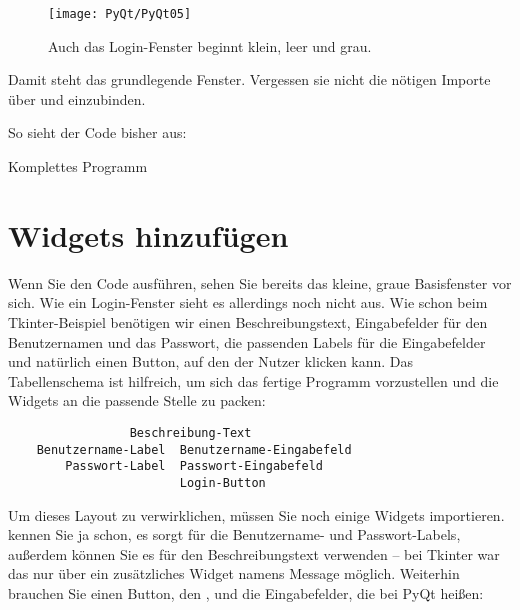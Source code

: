 
\medskip

\begin{figure}
  \texttt{[image: PyQt/PyQt05]}    
  \caption{Auch das Login-Fenster beginnt klein, leer und grau.}\label{PyQt05}
\end{figure}     
    
    

Damit steht das grundlegende Fenster. Vergessen sie nicht die nötigen Importe über  und  einzubinden.
    
So sieht der Code bisher aus:

\medskip
  
\begin{code}
          
  \caption{Komplettes Programm }
\end{code}     

 
\section{Widgets hinzufügen}

Wenn Sie den Code ausführen, sehen Sie bereits das kleine, graue Basisfenster vor sich. Wie ein Login-Fenster sieht es allerdings noch nicht aus. Wie schon beim Tkinter-Beispiel benötigen wir einen Beschreibungstext, Eingabefelder für den Benutzernamen und das Passwort, die passenden Labels für die Eingabefelder und natürlich einen Button, auf den der Nutzer klicken kann. Das Tabellenschema ist hilfreich, um sich das fertige Programm vorzustellen und die Widgets an die passende Stelle zu packen:

\begin{lstlisting}    
                 Beschreibung-Text
    Benutzername-Label  Benutzername-Eingabefeld
        Passwort-Label  Passwort-Eingabefeld
                        Login-Button
\end{lstlisting}

Um dieses Layout zu verwirklichen, müssen Sie noch einige Widgets importieren.  kennen Sie ja schon, es sorgt für die Benutzername- und Passwort-Labels, außerdem können Sie es für den Beschreibungstext verwenden -- bei Tkinter war das nur über ein zusätzliches Widget namens Message möglich. Weiterhin brauchen Sie einen Button, den , und die Eingabefelder, die bei PyQt  heißen:

